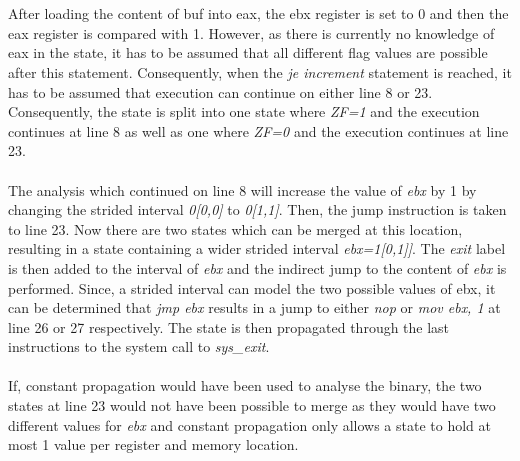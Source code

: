 \documentclass{kththesis}
\renewcommand{\it}[1]{\textit{#1}}
\begin{document}
\\ \\
After loading the content of buf into eax, the ebx register is set to 0 and then the eax register is compared with 1. However, as there is currently no knowledge of eax in the state, it has to be assumed that all different flag values are possible after this statement. Consequently, when the \it{je increment} statement is reached, it has to be assumed that execution can continue on either line 8 or 23. Consequently, the state is split into one state where \it{ZF=1} and the execution continues at line 8 as well as one where \it{ZF=0} and the execution continues at line 23. 
\\ \\
The analysis which continued on line 8 will increase the value of \it{ebx} by 1 by changing the strided interval \it{0[0,0]} to \it{0[1,1]}. Then, the jump instruction is taken to line 23. Now there are two states which can be merged at this location, resulting in a state containing a wider strided interval \it{ebx=1[0,1]]}. The \it{exit} label is then added to the interval of \it{ebx} and the indirect jump to the content of \it{ebx} is performed. Since, a strided interval can model the two possible values of ebx, it can be determined that \it{jmp ebx} results in a jump to either \it{nop} or \it{mov ebx, 1} at line 26 or 27 respectively. The state is then propagated through the last instructions to the system call to \it{sys\_exit}.
\\ \\
If, constant propagation would have been used to analyse the binary, the two states at line 23 would not have been possible to merge as they would have two different values for \it{ebx} and constant propagation only allows a state to hold at most 1 value per register and memory location.
\end{document}
